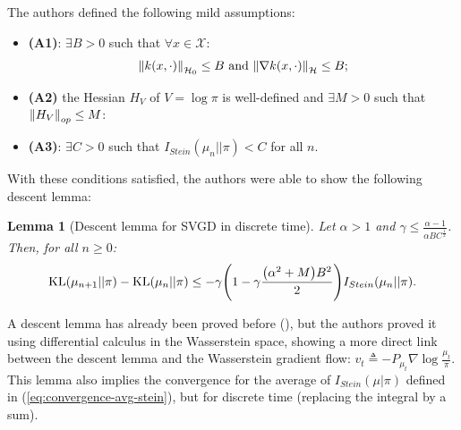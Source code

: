 \documentclass{article}
\newcommand{\X}{\mathcal{X}}
\newcommand{\KL}{\mathrm{KL}}
\renewcommand{\H}{\mathcal{H}}
\newcommand{\Stein}{I_{Stein}(\mu | \pi)}
\DeclarePairedDelimiter{\norm}{\|}{\|}
\DeclarePairedDelimiter{\pare}{(}{)}
\newtheorem{lemma}{Lemma}
\begin{document}
The authors defined the following mild assumptions:
\begin{itemize}
  \item {\bf (A1)}: $\exists B > 0$ such that $\forall x \in \X$:
    $$
    \norm*{k(x, \cdot)}_{\H_0} \leq B \text{ and } \norm*{\nabla k(x, \cdot)}_{\H} \leq B;
    $$
  \item {\bf (A2)} the Hessian $H_V$ of $V = \log \pi$ is well-defined and
    $\exists M > 0$ such that $\norm*{H_V}_{op} \leq M$:
  \item {\bf (A3)}: $\exists C > 0$ such that $I_{Stein}(\mu_n || \pi) < C$ for all $n$.
\end{itemize}
With these conditions satisfied, the authors were able to show the following descent
lemma:
\begin{lemma}[Descent lemma  for SVGD in discrete time]
  Let $\alpha > 1$ and $\gamma \leq \frac{\alpha-1}{\alpha B C^{\frac{1}{2}}}$.
  Then, for all $n \geq 0$:
  $$
  \KL(\mu_{n+1} || \pi) - \KL(\mu_n || \pi) \leq - \gamma \pare*{1 - \gamma
  \frac{\pare*{ \alpha^2 + M} B^2 }{2}} I_{Stein}(\mu_n || \pi).
  $$
\end{lemma}
A descent lemma has already been proved before (\cite{SVGD-flow}),
but the authors proved it using differential calculus in the Wasserstein space,
showing a more direct link between the descent lemma and the 
Wasserstein gradient flow: $v_t \triangleq -P_{\mu_t} \nabla \log \frac{\mu_t}{\pi}$.
This lemma also implies the convergence for the average of $\Stein$
defined in (\ref{eq:convergence-avg-stein}), but for discrete time (replacing the
integral by a sum).
\end{document}
